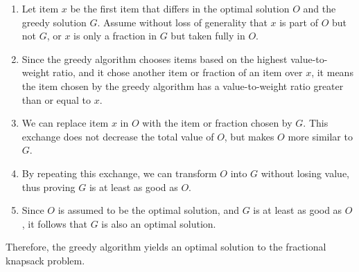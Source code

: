 \documentclass{article}
\begin{document}
\begin{enumerate}
    \item Let item \( x \) be the first item that differs in the optimal solution \( O \) and the greedy solution \( G \). Assume without loss of generality that \( x \) is part of \( O \) but not \( G \), or \( x \) is only a fraction in \( G \) but taken fully in \( O \).
    \item Since the greedy algorithm chooses items based on the highest value-to-weight ratio, and it chose another item or fraction of an item over \( x \), it means the item chosen by the greedy algorithm has a value-to-weight ratio greater than or equal to \( x \).
    \item We can replace item \( x \) in \( O \) with the item or fraction chosen by \( G \). This exchange does not decrease the total value of \( O \), but makes \( O \) more similar to \( G \).
    \item By repeating this exchange, we can transform \( O \) into \( G \) without losing value, thus proving \( G \) is at least as good as \( O \).
    \item Since \( O \) is assumed to be the optimal solution, and \( G \) is at least as good as \( O \), it follows that \( G \) is also an optimal solution.
\end{enumerate}

Therefore, the greedy algorithm yields an optimal solution to the fractional knapsack problem.
\end{document}
